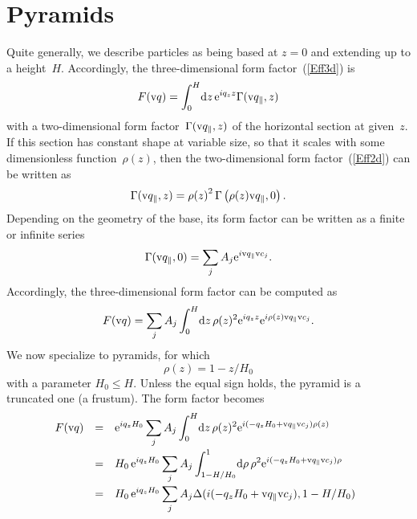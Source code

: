 \section{Pyramids}

%
%
%
%

Quite generally, we describe particles
as being based at $z=0$ and extending up to a height~$H$.
Accordingly,
the three-dimensional form factor~(\ref{Eff3d}) is
\begin{equation}
  F(\text{v}{q}) = \int_0^H\!\text{d} z\,\text{e}^{iq_z z} \Gamma(\text{v}{q}_\parallel,z)
\end{equation}
with a two-dimensional form factor~$\Gamma(\text{v}{q}_\parallel,z)$
of the horizontal section at given~$z$.
If this section has constant shape at variable size,
so that it scales with some dimensionless function~$\rho(z)$,
then the two-dimensional form factor~(\ref{Eff2d})
can be written as
\begin{equation}
  \Gamma(\text{v}{q}_\parallel,z)
  = {\rho(z)}^2\, \Gamma\left(\rho(z)\text{v}{q}_\parallel,0\right).
\end{equation}
Depending on the geometry of the base,
its form factor can be written as a finite or infinite series
\begin{equation}
  \Gamma(\text{v}{q}_\parallel,0)=\sum_j A_j \text{e}^{i\text{v}{q}_\parallel \text{v}{c}_j}.
\end{equation}
Accordingly, the three-dimensional form factor can be computed as
\begin{equation}
  F(\text{v}{q}) = \sum_j A_j \int_0^H\!\text{d} z\,\rho(z)^2\text{e}^{iq_z z} \text{e}^{i\rho(z)\text{v}{q}_\parallel \text{v}{c}_j}.
\end{equation}
We now specialize to pyramids,
for which
\begin{equation}
  \rho(z) = 1-z/H_0
\end{equation}
with a parameter $H_0\le H$.
Unless the equal sign holds,
the pyramid is a truncated one (a frustum).
The form factor becomes
\begin{equation}
  \begin{array}{@{}lcl}
  F(\q)
  &=& \displaystyle
       \e^{iq_z H_0} \sum_j A_j \int_0^H\!\d z\,\rho(z)^2\e^{i(-q_zH_0 +\q_\parallel \v{c}_j)\rho(z)}
\\[3ex]
  &=& \displaystyle
       H_0\, \e^{iq_z H_0} \sum_j A_j \int_{1-H/H_0}^1\!\d\rho\, \rho^2\e^{i(-q_zH_0 +\q_\parallel \v{c}_j)\rho}
\\[3ex]
  &=& \displaystyle
       H_0\, \e^{iq_z H_0} \sum_j A_j \Delta(i(-q_zH_0 +\q_\parallel \v{c}_j),1-H/H_0)
  \end{array}
\end{equation}
